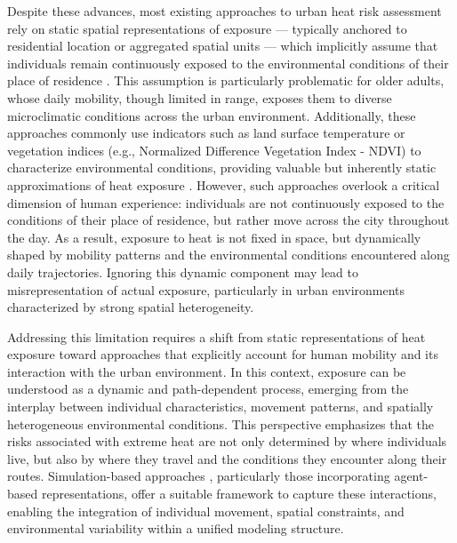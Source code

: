 \documentclass{wscpaperproc}
\theoremstyle{wsc}
\begin{document}
Despite these advances, most existing approaches to urban heat risk assessment rely on static spatial representations of exposure — typically anchored to residential location or aggregated spatial units — which implicitly assume that individuals remain continuously exposed to the environmental conditions of their place of residence \cite{buscail2012heatwave}. This assumption is particularly problematic for older adults, whose daily mobility, though limited in range, exposes them to diverse microclimatic conditions across the urban environment. Additionally, these approaches commonly use indicators such as land surface temperature or vegetation indices (e.g.,  Normalized Difference Vegetation Index - NDVI) to characterize environmental conditions, providing valuable but inherently static approximations of heat exposure \cite{niu2021heat}. However, such approaches overlook a critical dimension of human experience: individuals are not continuously exposed to the conditions of their place of residence, but rather move across the city throughout the day. As a result, exposure to heat is not fixed in space, but dynamically shaped by mobility patterns and the environmental conditions encountered along daily trajectories. Ignoring this dynamic component may lead to misrepresentation of actual exposure, particularly in urban environments characterized by strong spatial heterogeneity.

Addressing this limitation requires a shift from static representations of heat exposure toward approaches that explicitly account for human mobility and its interaction with the urban environment. In this context, exposure can be understood as a dynamic and path-dependent process, emerging from the interplay between individual characteristics, movement patterns, and spatially heterogeneous environmental conditions. This perspective emphasizes that the risks associated with extreme heat are not only determined by where individuals live, but also by where they travel and the conditions they encounter along their routes. Simulation-based approaches \cite{batty2005cities} \cite{miller2007complex}, particularly those incorporating agent-based representations, offer a suitable framework to capture these interactions, enabling the integration of individual movement, spatial constraints, and environmental variability within a unified modeling structure.
\end{document}
